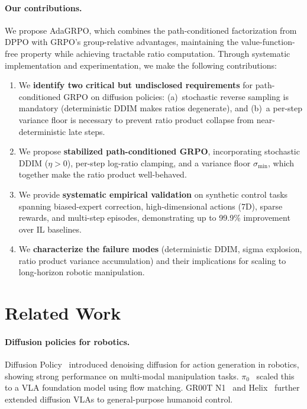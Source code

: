 \documentclass{article}
\begin{document}
\paragraph{Our contributions.}
We propose AdaGRPO, which combines the path-conditioned factorization from DPPO with GRPO's group-relative advantages, maintaining the value-function-free property while achieving tractable ratio computation.
Through systematic implementation and experimentation, we make the following contributions:

\begin{enumerate}
\item We \textbf{identify two critical but undisclosed requirements} for path-conditioned GRPO on diffusion policies: (a)~stochastic reverse sampling is mandatory (deterministic DDIM makes ratios degenerate), and (b)~a per-step variance floor is necessary to prevent ratio product collapse from near-deterministic late steps.

\item We propose \textbf{stabilized path-conditioned GRPO}, incorporating stochastic DDIM ($\eta > 0$), per-step log-ratio clamping, and a variance floor $\sigma_{\min}$, which together make the ratio product well-behaved.

\item We provide \textbf{systematic empirical validation} on synthetic control tasks spanning biased-expert correction, high-dimensional actions (7D), sparse rewards, and multi-step episodes, demonstrating up to 99.9\% improvement over IL baselines.

\item We \textbf{characterize the failure modes} (deterministic DDIM, sigma explosion, ratio product variance accumulation) and their implications for scaling to long-horizon robotic manipulation.
\end{enumerate}


\section{Related Work}
\label{sec:related}

\paragraph{Diffusion policies for robotics.}
Diffusion Policy~\cite{chi2023diffusionpolicy} introduced denoising diffusion for action generation in robotics, showing strong performance on multi-modal manipulation tasks.
$\pi_0$~\cite{black2024pi0} scaled this to a VLA foundation model using flow matching.
GR00T N1~\cite{bjorck2025gr00tn1} and Helix~\cite{helix2025} further extended diffusion VLAs to general-purpose humanoid control.
\end{document}
